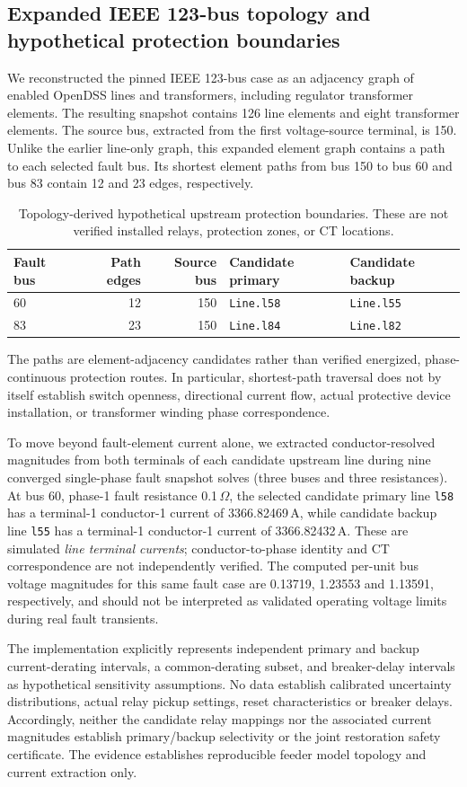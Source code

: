 \subsection{Expanded IEEE 123-bus topology and hypothetical protection boundaries}
\label{sec:expanded-topology}
We reconstructed the pinned IEEE 123-bus case as an adjacency graph of enabled OpenDSS lines and transformers, including regulator transformer elements. The resulting snapshot contains 126 line elements and eight transformer elements. The source bus, extracted from the first voltage-source terminal, is 150. Unlike the earlier line-only graph, this expanded element graph contains a path to each selected fault bus. Its shortest element paths from bus 150 to bus 60 and bus 83 contain 12 and 23 edges, respectively.

\begin{table}[H]\centering
\caption{Topology-derived hypothetical upstream protection boundaries. These are not verified installed relays, protection zones, or CT locations.}
\label{tab:topology-boundaries}
\begin{tabular}{lrrll}\toprule
Fault bus & Path edges & Source bus & Candidate primary & Candidate backup\\\midrule
60 & 12 & 150 & \texttt{Line.l58} & \texttt{Line.l55}\\
83 & 23 & 150 & \texttt{Line.l84} & \texttt{Line.l82}\\\bottomrule
\end{tabular}
\end{table}
The paths are element-adjacency candidates rather than verified energized, phase-continuous protection routes. In particular, shortest-path traversal does not by itself establish switch openness, directional current flow, actual protective device installation, or transformer winding phase correspondence.

To move beyond fault-element current alone, we extracted conductor-resolved magnitudes from both terminals of each candidate upstream line during nine converged single-phase fault snapshot solves (three buses and three resistances). At bus 60, phase-1 fault resistance 0.1\,\(\Omega\), the selected candidate primary line \texttt{l58} has a terminal-1 conductor-1 current of 3366.82469\,A, while candidate backup line \texttt{l55} has a terminal-1 conductor-1 current of 3366.82432\,A. These are simulated \emph{line terminal currents}; conductor-to-phase identity and CT correspondence are not independently verified. The computed per-unit bus voltage magnitudes for this same fault case are 0.13719, 1.23553 and 1.13591, respectively, and should not be interpreted as validated operating voltage limits during real fault transients.

The implementation explicitly represents independent primary and backup current-derating intervals, a common-derating subset, and breaker-delay intervals as hypothetical sensitivity assumptions. No data establish calibrated uncertainty distributions, actual relay pickup settings, reset characteristics or breaker delays. Accordingly, neither the candidate relay mappings nor the associated current magnitudes establish primary/backup selectivity or the joint restoration safety certificate. The evidence establishes reproducible feeder model topology and current extraction only.
